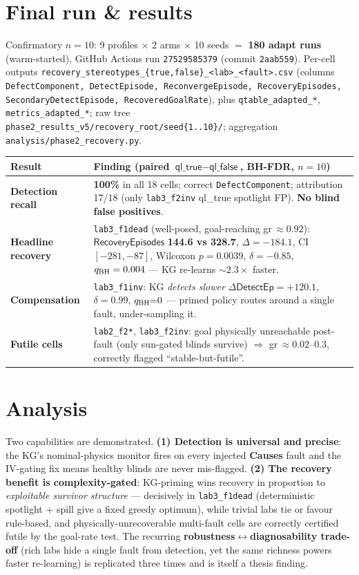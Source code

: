 \documentclass[10pt,a4paper]{article}
\newcommand{\file}[1]{\texttt{\small #1}}
\newcommand{\kw}[1]{\textbf{#1}}
\begin{document}
\section{Final run \& results}
Confirmatory \(n{=}10\): 9 profiles \(\times\) 2 arms \(\times\) 10 seeds \(=\) \kw{180 adapt runs} (warm-started),
GitHub Actions run \texttt{27529585379} (commit \texttt{2aab559}). Per-cell outputs
\file{recovery\_stereotypes\_\{true,false\}\_<lab>\_<fault>.csv} (columns
\texttt{DefectComponent, DetectEpisode, ReconvergeEpisode, RecoveryEpisodes, SecondaryDetectEpisode, RecoveredGoalRate}),
plus \file{qtable\_adapted\_*}, \file{metrics\_adapted\_*}; raw tree
\file{phase2\_results\_v5/recovery\_root/seed\{1..10\}/}; aggregation \file{analysis/phase2\_recovery.py}.

\begin{center}\footnotesize
\begin{tabular}{@{}lp{8.6cm}@{}}
\toprule
\rowcolor{boxgrey} Result & Finding (paired \(\textsf{ql\_true}-\textsf{ql\_false}\), BH-FDR, \(n=10\))\\
\midrule
\kw{Detection recall} & \kw{100\%} in all 18 cells; correct \texttt{DefectComponent}; attribution 17/18 (only \file{lab3\_f2inv} \textsf{ql\_true} spotlight FP). \kw{No blind false positives}.\\
\kw{Headline recovery} & \file{lab3\_f1dead} (well-posed, goal-reaching gr\,\(\approx0.92\)): \(\textsf{RecoveryEpisodes}\) \kw{144.6 vs 328.7}, \(\Delta=-184.1\), CI\([-281,-87]\), Wilcoxon \(p{=}0.0039\), \(\delta=-0.85\), \(q_{\rm BH}=0.004\) — KG re-learns \(\sim2.3\times\) faster.\\
\kw{Compensation} & \file{lab3\_f1inv}: KG \emph{detects slower} \(\Delta\textsf{DetectEp}=+120.1\), \(\delta=0.99\), \(q_{\rm BH}{=}0\) — primed policy routes around a single fault, under-sampling it.\\
\kw{Futile cells} & \file{lab2\_f2*}, \file{lab3\_f2inv}: goal physically unreachable post-fault (only sun-gated blinds survive) \(\Rightarrow\) gr\,\(\approx 0.02\text{--}0.3\), correctly flagged ``stable-but-futile''.\\
\bottomrule
\end{tabular}
\end{center}

\section{Analysis}
Two capabilities are demonstrated. \kw{(1) Detection is universal and precise}: the KG's nominal-physics
monitor fires on every injected \kw{Causes} fault and the IV-gating fix means healthy blinds are never
mis-flagged. \kw{(2) The recovery benefit is complexity-gated}: KG-priming wins recovery in proportion to
\emph{exploitable survivor structure} — decisively in \file{lab3\_f1dead} (deterministic spotlight + spill
give a fixed greedy optimum), while trivial labs tie or favour rule-based, and physically-unrecoverable
multi-fault cells are correctly certified futile by the goal-rate test. The recurring
\kw{robustness\(\leftrightarrow\)diagnosability trade-off} (rich labs hide a single fault from detection,
yet the same richness powers faster re-learning) is replicated three times and is itself a thesis finding.
\end{document}
